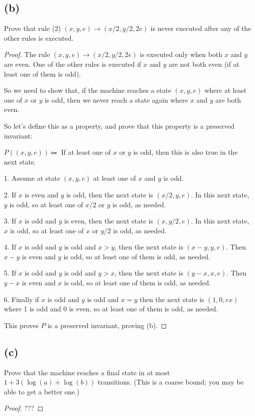 \documentclass[14pt]{extarticle}
\begin{document}
\subsection{(b)}
Prove that rule (2) $(x,y,e) \to (x/2, y/2, 2e)$ is never executed after any of the other rules is executed.
\begin{proof}
The rule $(x,y,e) \to (x/2, y/2, 2e)$ is executed only when both $x$ and $y$ are even. One of the other rules is executed if $x$ and $y$ are not both even (if at least one of them is odd).

So we need to show that, if the machine reaches a state $(x, y, e)$ where at least one of $x$ or $y$ is odd, then we never reach a state again where $x$ and $y$ are both even.

So let's define this as a property, and prove that this property is a preserved invariant:

$P((x,y,e)) \Coloneqq$ If at least one of $x$ or $y$ is odd, then this is also true in the next state.

1. Assume at state $(x, y, e)$ at least one of $x$ and $y$ is odd.

2. If $x$ is even and $y$ is odd, then the next state is $(x/2, y, e)$. In this next state, $y$ is odd, so at least one of $x/2$ or $y$ is odd, as needed.

3. If $x$ is odd and $y$ is even, then the next state is $(x, y/2, e)$. In this next state, $x$ is odd, so at least one of $x$ or $y/2$ is odd, as needed.

4. If $x$ is odd and $y$ is odd and $x > y$, then the next state is $(x - y, y, e)$. Then $x-y$ is even and $y$ is odd, so at least one of them is odd, as needed.

5. If $x$ is odd and $y$ is odd and $y > x$, then the next state is $(y - x, x, e)$. Then $y-x$ is even and $x$ is odd, so at least one of them is odd, as needed.

6. Finally if $x$ is odd and $y$ is odd and $x = y$ then the next state is $(1,0,ex)$ where 1 is odd and 0 is even, so at least one of them is odd, as needed.

This proves $P$ is a preserved invariant, proving (b).
\end{proof}

\subsection{(c)}
Prove that the machine reaches a final state in at most $1 + 3(\log(a) + \log(b))$ transitions. (This is a coarse bound; you may be able to get a better one.)
\begin{proof}
???
\end{proof}
\end{document}
